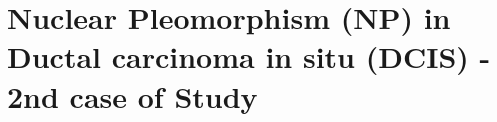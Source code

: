 \documentclass[usenames,dvipsnames]{beamer}
\begin{document}
%
%


\section{Nuclear Pleomorphism (NP) in Ductal carcinoma in situ (DCIS) - 2nd case of Study}

\end{document}
